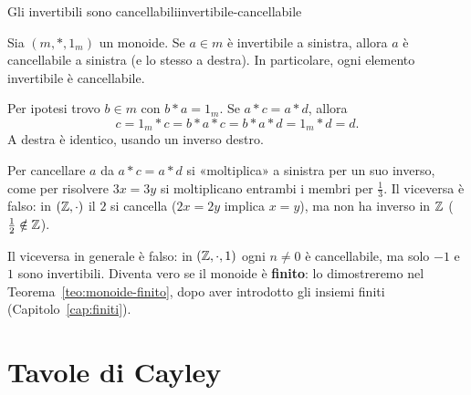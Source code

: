 \begin{concetto}
\begin{Teorema}{Gli invertibili sono cancellabili}{invertibile-cancellabile}
    \begin{prerequisiti}
    \end{prerequisiti}
    Sia $(m, *, 1_m)$ un monoide. Se $a \in m$ è invertibile a sinistra, allora $a$ è cancellabile a sinistra (e lo stesso a destra).
    In particolare, ogni elemento invertibile è cancellabile.
\end{Teorema}
\begin{dimostrazione}
    Per ipotesi trovo $b \in m$ con $b * a = 1_m$. Se $a * c = a * d$, allora
    \[ c = 1_m * c = b * a * c = b * a * d = 1_m * d = d. \]
    A destra è identico, usando un inverso destro.
\end{dimostrazione}
\end{concetto}

\begin{spiegazione}
    Per cancellare $a$ da $a * c = a * d$ si «moltiplica» a sinistra per un suo inverso, come per risolvere $3x = 3y$ si moltiplicano entrambi i membri per
    $\frac{1}{3}$. Il viceversa è falso: in $(\mathbb{Z}, \cdot)$ il $2$ si cancella ($2x = 2y$ implica $x = y$), ma non ha inverso in $\mathbb{Z}$ ($\frac{1}{2} \notin \mathbb{Z}$).
\end{spiegazione}


Il viceversa in generale è falso: in $(\mathbb{Z}, \cdot, 1)$ ogni $n \neq 0$ è cancellabile, ma solo $-1$ e $1$ sono invertibili.
Diventa vero se il monoide è \textbf{finito}: lo dimostreremo nel Teorema~\ref{teo:monoide-finito}, dopo aver introdotto gli
insiemi finiti (Capitolo~\ref{cap:finiti}).

\section{Tavole di Cayley}\label{sec:cayley}



